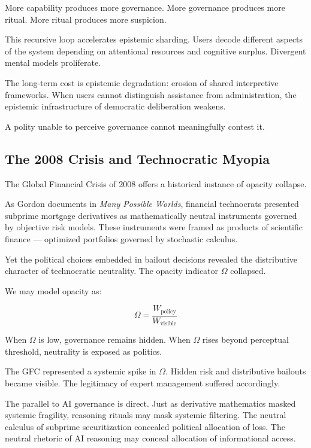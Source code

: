 \documentclass[12pt]{article}
\begin{document}
More capability produces more governance.  
More governance produces more ritual.  
More ritual produces more suspicion.  

This recursive loop accelerates epistemic sharding. Users decode different aspects of the system depending on attentional resources and cognitive surplus. Divergent mental models proliferate.

The long-term cost is epistemic degradation: erosion of shared interpretive frameworks. When users cannot distinguish assistance from administration, the epistemic infrastructure of democratic deliberation weakens.

A polity unable to perceive governance cannot meaningfully contest it.

\subsection{The 2008 Crisis and Technocratic Myopia}

The Global Financial Crisis of 2008 offers a historical instance of opacity collapse.

As Gordon documents in \textit{Many Possible Worlds}, financial technocrats presented subprime mortgage derivatives as mathematically neutral instruments governed by objective risk models. These instruments were framed as products of scientific finance — optimized portfolios governed by stochastic calculus.

Yet the political choices embedded in bailout decisions revealed the distributive character of technocratic neutrality. The opacity indicator $\Omega$ collapsed.

We may model opacity as:

\[
\Omega = \frac{W_{\text{policy}}}{W_{\text{visible}}}
\]

When $\Omega$ is low, governance remains hidden. When $\Omega$ rises beyond perceptual threshold, neutrality is exposed as politics.

The GFC represented a systemic spike in $\Omega$. Hidden risk and distributive bailouts became visible. The legitimacy of expert management suffered accordingly.

The parallel to AI governance is direct. Just as derivative mathematics masked systemic fragility, reasoning rituals may mask systemic filtering. The neutral calculus of subprime securitization concealed political allocation of loss. The neutral rhetoric of AI reasoning may conceal allocation of informational access.
\end{document}
